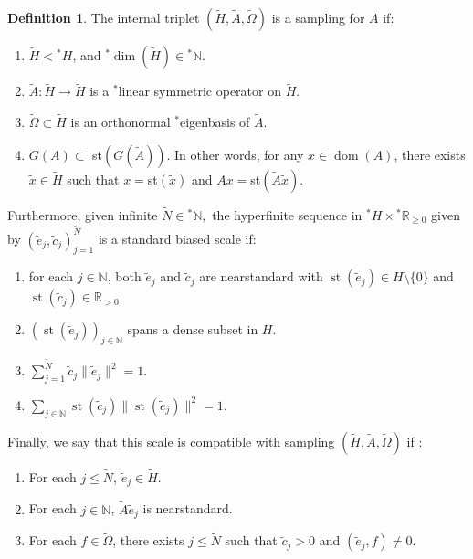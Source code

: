 \documentclass{amsart}
\theoremstyle{definition}
\newtheorem{defn}[thm]{Definition}
\theoremstyle{remark}
\def \St{\operatorname{st}}
\newcounter{pointnumber}
\begin{document}
\begin{defn}\label{definition_nonstandard_sampling}
		The internal triplet $(\tilde{H},\tilde{A},\tilde{\Omega})$ is a sampling for $A$ if:
	
	\begin{enumerate}
		\item \label{property_nonstandard_dimension} $\tilde{H}<{}^*H$, and ${}^*\operatorname{dim}(\tilde{H})\in{}^*\mathbb{N}$. 
		\item \label{property_nonstandard_symmetric} $\tilde{A}:\tilde{H}\rightarrow\tilde{H}$ is a ${}^*$linear symmetric operator on $\tilde{H}$.
		\item \label{property_nonstandard_eigenbasis} $\tilde{\Omega}\subset\tilde{H}$ is an orthonormal ${}^*$eigenbasis of $\tilde{A}$.
		
		\item \label{property_nonstandard_approximation} $G(A)\subset$ st$(G(\tilde{A}))$. In other words, for any $x\in \operatorname{dom}(A)$, there exists $\tilde{x}\in \tilde{H}$ such that $x=$st$(\tilde{x})$ and $Ax=$st$(\tilde{A}\tilde{x})$.
		\setcounter{pointnumber}{\value{enumi}}
	\end{enumerate}
	
	Furthermore, given infinite $\tilde{N}\in{}^*\mathbb{N},$ the hyperfinite sequence in ${}^*H\times {}^*\mathbb{R}_{\geq0}$ given by $(\tilde{e}_j,\tilde{c}_j)_{j=1}^{\tilde{N}}$ is a standard biased scale if:
	
	\begin{enumerate}
		\setcounter{enumi}{\value{pointnumber}}
		\item\label{property_nonstandard_scale_NS} for each $j\in\mathbb{N}$, both $\tilde{e}_j$ and $\tilde{c}_j$ are nearstandard with $\St(\tilde{e}_j)\in H\setminus\{0\}$ and $\St(\tilde{c}_j)\in\mathbb{R}_{>0}.$
		\item\label{property_nonstandard_scale_dense} $(\St(\tilde{e}_j))_{j\in\mathbb{N}}$ spans a dense subset in $H$.
		\item \label{property_nonstandard_scale_proba} $\sum_{j=1}^{\tilde{N}}\tilde{c}_j\|\tilde{e}_j\|^2=1$.
		\item \label{property_nonstandard_scale_bias} $\sum_{j\in\mathbb{N}}\St(\tilde{c}_j)\|\St(\tilde{e}_j)\|^2=1$.
		
		\setcounter{pointnumber}{\value{enumi}}
	\end{enumerate}
	
	Finally, we say that this scale is compatible with sampling $(\tilde{H},\tilde{A},\tilde{\Omega})$ if :
	\begin{enumerate}
		\setcounter{enumi}{\value{pointnumber}}
		\item \label{property_nonstandard_compat_H} For each $j\leq\tilde{N}$, $\tilde{e}_j\in\tilde{H}$.
		\item \label{property_nonstandard_compat_A} For each $j\in \mathbb{N}$, $\tilde{A}\tilde{e}_j$ is nearstandard.
		\item \label{property_nonstandard_compat_Omega} For each $f\in\tilde{\Omega}$, there exists $j\leq\tilde{N}$ such that $\tilde{c}_j>0$ and $(\tilde{e}_j,f)\neq0$.
	\end{enumerate}
\end{defn}
\end{document}
